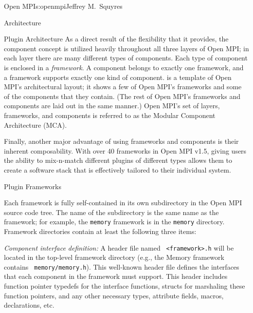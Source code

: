\begin{aosachapter}{Open MPI}{s:openmpi}{Jeffrey M.\ Squyres}
\begin{aosasect1}{Architecture}
\begin{aosasect2}{Plugin Architecture}
As a direct result of the flexibility that it provides, the component
concept is utilized heavily throughout all three layers of Open MPI;
in each layer there are many different types of components.
%
Each type of component is enclosed in a \emph{framework}.
%
A component belongs to exactly one framework, and a framework supports
exactly one kind of component.
%
 is a template of Open MPI's architectural
layout; it shows a few of Open MPI's frameworks and some of the
components that they contain.  (The rest of Open MPI's frameworks and
components are laid out in the same manner.)
%
Open MPI's set of layers, frameworks, and components is referred to as
the Modular Component Architecture (MCA).


Finally, another major advantage of using frameworks and components is
their inherent composability.  With over 40 frameworks in Open MPI
v1.5, giving users the ability to mix-n-match different plugins of
different types allows them to create a software stack that is
effectively tailored to their individual system.

\end{aosasect2}


\begin{aosasect2}{Plugin Frameworks}

Each framework is fully self-contained in its own subdirectory in the
Open MPI source code tree.  The name of the subdirectory is the same
name as the framework; for example, the {\tt memory} framework is in
the {\tt memory} directory.  
%
Framework directories contain at least the following three items:

\begin{aosaenumerate}
\item \emph{Component interface definition:} A header file named {\tt
    <framework>.h} will be located in the top-level framework
  directory (e.g., the Memory framework contains {\tt
    memory/memory.h}).  This well-known header file defines the
  interfaces that each component in the framework must support.  This
  header includes function pointer typedefs for the interface
  functions, structs for marshaling these function pointers, and any
  other necessary types, attribute fields, macros, declarations, etc.


\end{aosaenumerate}
\end{aosasect2}
\end{aosasect1}
\end{aosachapter}
